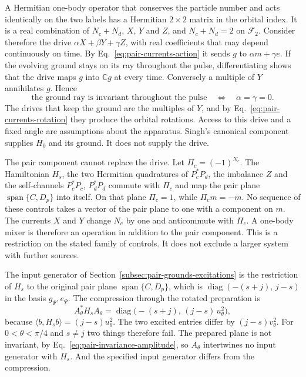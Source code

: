 \documentclass[11pt]{article}
\theoremstyle{definition}
\DeclareMathOperator{\Span}{span}
\newcommand{\C}{\mathbb C}
\begin{document}
A Hermitian one-body operator that conserves the particle number and acts identically on the two labels has a Hermitian $2\times2$ matrix in the orbital index. It is a real combination of $N_c+N_d$, $X$, $Y$ and $Z$, and $N_c+N_d=2$ on $\mathcal F_2$. Consider therefore the drive $\alpha X+\beta Y+\gamma Z$, with real coefficients that may depend continuously on time. By Eq.~\eqref{eq:pair-currents-action} it sends $g$ to $\alpha m+\gamma e$. If the evolving ground stays on its ray throughout the pulse, differentiating shows that the drive maps $g$ into $\C g$ at every time. Conversely a multiple of $Y$ annihilates $g$. Hence
\begin{equation}
 \text{the ground ray is invariant throughout the pulse}
 \quad\Longleftrightarrow\quad \alpha=\gamma=0 .
 \label{eq:pair-currents-drive}
\end{equation}
The drives that keep the ground are the multiples of $Y$, and by Eq.~\eqref{eq:pair-currents-rotation} they produce the orbital rotations. Access to this drive and a fixed angle are assumptions about the apparatus. Singh's canonical component supplies $H_0$ and its ground. It does not supply the drive.

The pair component cannot replace the drive. Let $\Pi_c=(-1)^{N_c}$. The Hamiltonian $H_s$, the two Hermitian quadratures of $P_c^*P_d$, the imbalance $Z$ and the self-channels $P_c^*P_c$, $P_d^*P_d$ commute with $\Pi_c$ and map the pair plane $\Span\{C,D_p\}$ into itself. On that plane $\Pi_c=1$, while $\Pi_cm=-m$. No sequence of these controls takes a vector of the pair plane to one with a component on $m$. The currents $X$ and $Y$ change $N_c$ by one and anticommute with $\Pi_c$. A one-body mixer is therefore an operation in addition to the pair component. This is a restriction on the stated family of controls. It does not exclude a larger system with further sources.

The input generator of Section~\ref{subsec:pair-grounds-excitations} is the restriction of $H_s$ to the original pair plane $\Span\{C,D_p\}$, which is $\operatorname{diag}(-(s+j),\,j-s)$ in the basis $g_\Psi,e_\Psi$. The compression through the rotated preparation is
\begin{equation}
 A_\theta^*H_sA_\theta=\operatorname{diag}\bigl(-(s+j),\,(j-s)\,u_\theta^2\bigr),
 \label{eq:pair-currents-compression}
\end{equation}
because $\langle b,H_sb\rangle=(j-s)u_\theta^2$. The two excited entries differ by $(j-s)v_\theta^2$. For $0<\theta<\pi/4$ and $s\ne j$ two things therefore fail. The prepared plane is not invariant, by Eq.~\eqref{eq:pair-invariance-amplitude}, so $A_\theta$ intertwines no input generator with $H_s$. And the specified input generator differs from the compression.
\end{document}
